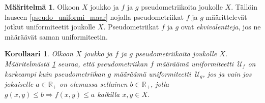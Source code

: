 \documentclass[12pt,a4paper,leqno]{report}
\newcommand{\R}{\mathbb{R}}
\newcommand{\U}{\,\mathcal{U}}
\theoremstyle{plain}
\newtheorem{kor}[equation]{Korollaari}
\theoremstyle{definition}
\newtheorem{maar}[equation]{Määritelmä}
\theoremstyle{remark}
\begin{document}
\begin{maar}\label{pseudo_equiv}
Olkoon $X$ joukko ja $f$ ja $g$ pseudometriikoita joukolle $X$. 
Tällöin lauseen \ref{pseudo_uniformi_maar} nojalla 
pseudometriikat $f$ ja $g$ määrittelevät jotkut uniformiteetit joukolle $X$.
Pseudometriikat $f$ ja $g$ ovat \emph{ekvivalentteja}, jos ne määräävät saman uniformiteetin.
\end{maar}
\begin{kor}
Olkoon $X$ joukko ja $f$ ja $g$ pseudometriikoita joukolle $X$. 
Määritelmästä \ref{pseudo_equiv} seuraa, että pseudometriikan $f$ määräämä uniformiteetti 
$\U_f$ 
on karkeampi kuin pseudometriikan $g$ määräämä uniformiteetti $\U_g$, jos ja vain jos jokaiselle 
$a\in\R_+$ on olemassa sellainen $b\in\R_+$, jolla $g(x,y)\leq b \Rightarrow f(x,y)\leq a$ kaikilla $x,y\in X$.


\end{kor}
\end{document}
